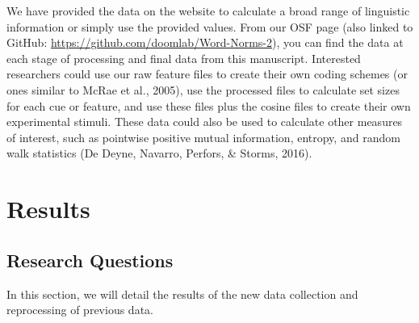 \documentclass[english,,man]{apa6}
\begin{document}
We have provided the data on the website to calculate a broad range of linguistic information or simply use the provided values. From our OSF page (also linked to GitHub: \url{https://github.com/doomlab/Word-Norms-2}), you can find the data at each stage of processing and final data from this manuscript. Interested researchers could use our raw feature files to create their own coding schemes (or ones similar to McRae et al., 2005), use the processed files to calculate set sizes for each cue or feature, and use these files plus the cosine files to create their own experimental stimuli. These data could also be used to calculate other measures of interest, such as pointwise positive mutual information, entropy, and random walk statistics (De Deyne, Navarro, Perfors, \& Storms, 2016).

\hypertarget{results}{%
\section{Results}\label{results}}

\hypertarget{research-questions}{%
\subsection{Research Questions}\label{research-questions}}

In this section, we will detail the results of the new data collection and reprocessing of previous data.
\end{document}

